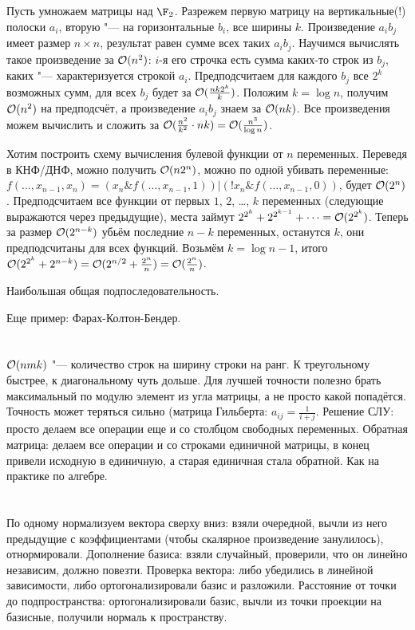 \section{} %
Пусть умножаем матрицы над $\F_2$.
Разрежем первую матрицу на вертикальные(!) полоски $a_i$, вторую "--- на горизонтальные $b_i$, все ширины $k$.
Произведение $a_ib_j$ имеет размер $n \times n$, результат равен сумме всех таких $a_ib_j$.
Научимся вычислять такое произведение за $\mathcal{O}(n^2)$: $i$-я его строчка есть сумма каких-то строк из $b_j$, каких "--- характеризуется строкой $a_i$.
Предподсчитаем для каждого $b_j$ все $2^k$ возможных сумм, для всех $b_j$ будет за $\mathcal{O}(\frac{nk2^k}{k})$.
Положим $k=\log n$, получим $\mathcal{O}(n^2)$ на предподсчёт, а произведение $a_ib_j$ знаем за $\mathcal{O}(nk)$.
Все произведения можем вычислить и сложить за $\mathcal{O}(\frac{n^2}{k^2} \cdot nk) = \mathcal{O}(\frac{n^3}{\log n})$.

Хотим построить схему вычисления булевой функции от $n$ переменных.
Переведя в КНФ/ДНФ, можно получить $\mathcal{O}(n2^n)$, можно по одной убивать переменные: $f(\dots, x_{n-1}, x_n) = (x_n \& f(\dots, x_{n-1}, 1)) | (!x_n \& f(\dots, x_{n-1}, 0))$, будет $\mathcal{O}(2^n)$.
Предподсчитаем все функции от первых $1$, $2$, \dots, $k$ переменных (следующие выражаются через предыдущие), места займут $2^{2^k} + 2^{2^{k-1}} + \dots = \mathcal{O}(2^{2^k})$.
Теперь за размер $\mathcal{O}(2^{n-k})$ убьём последние $n-k$ переменных, останутся $k$, они предподсчитаны для всех функций.
Возьмём $k=\log n - 1$, итого $\mathcal{O}(2^{2^k} + 2^{n-k})=\mathcal{O}(2^{n/2}+\frac{2^n}{n})=\mathcal{O}(\frac{2^n}{n})$.

\TODO Наибольшая общая подпоследовательность.

Еще пример: Фарах-Колтон-Бендер.

\section{} %
$\mathcal{O}(nmk)$ "--- количество строк на ширину строки на ранг.
К треугольному быстрее, к диагональному чуть дольше.
Для лучшей точности полезно брать максимальный по модулю элемент из угла матрицы, а не просто какой попадётся.
Точность может теряться сильно (матрица Гильберта: $a_{ij}=\frac{1}{i+j}$.
Решение СЛУ: просто делаем все операции еще и со столбцом свободных переменных.
Обратная матрица: делаем все операции и со строками единичной матрицы, в конец привели исходную в единичную, а старая единичная стала обратной.
Как на практике по алгебре.

\section{} %
По одному нормализуем вектора сверху вниз: взяли очередной, вычли из него предыдущие с коэффициентами (чтобы скалярное произведение занулилось), отнормировали.
Дополнение базиса: взяли случайный, проверили, что он линейно независим, должно повезти.
Проверка вектора: либо убедились в линейной зависимости, либо ортогонализировали базис и разложили.
Расстояние от точки до подпространства: ортогонализировали базис, вычли из точки проекции на базисные, получили нормаль к пространству.
\TODO

